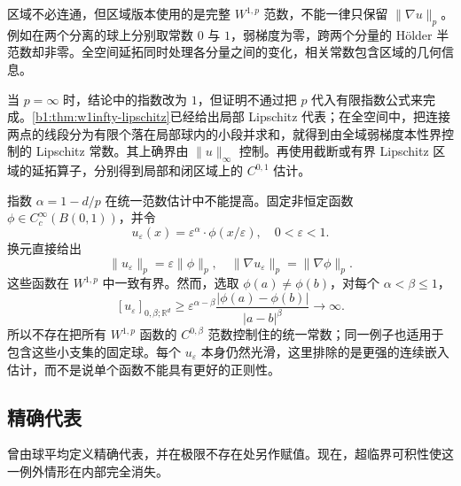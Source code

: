 区域不必连通，但区域版本使用的是完整 \(W^{1,p}\) 范数，不能一律只保留 \(\|\nabla u\|_p\)。例如在两个分离的球上分别取常数 \(0\) 与 \(1\)，弱梯度为零，跨两个分量的 Hölder 半范数却非零。全空间延拓同时处理各分量之间的变化，相关常数包含区域的几何信息。

\ProseParagraphBreak

当 \(p=\infty\) 时，结论中的指数改为 \(1\)，但证明不通过把 \(p\) 代入有限指数公式来完成。\cref{b1:thm:w1infty-lipschitz}已经给出局部 Lipschitz 代表；在全空间中，把连接两点的线段分为有限个落在局部球内的小段并求和，就得到由全域弱梯度本性界控制的 Lipschitz 常数。其上确界由 \(\|u\|_\infty\) 控制。再使用截断或有界 Lipschitz 区域的延拓算子，分别得到局部和闭区域上的 \(C^{0,1}\) 估计。

\ProseParagraphBreak

指数 \(\alpha=1-d/p\) 在统一范数估计中不能提高。固定非恒定函数 \(\phi\in C_c^\infty(B(0,1))\)，并令
\[
 u_\varepsilon(x)=\varepsilon^\alpha\cdot\phi(x/\varepsilon),
 \quad 0<\varepsilon<1.
\]
换元直接给出
\[
 \|u_\varepsilon\|_p=\varepsilon\|\phi\|_p,\quad
 \|\nabla u_\varepsilon\|_p=\|\nabla\phi\|_p.
\]
这些函数在 \(W^{1,p}\) 中一致有界。然而，选取 \(\phi(a)\ne\phi(b)\)，对每个 \(\alpha<\beta\le1\)，
\[
 [u_\varepsilon]_{0,\beta;\mathbb R^d}
 \ge\varepsilon^{\alpha-\beta}
       \frac{|\phi(a)-\phi(b)|}{|a-b|^\beta}
 \longrightarrow\infty.
\]
所以不存在把所有 \(W^{1,p}\) 函数的 \(C^{0,\beta}\) 范数控制住的统一常数；同一例子也适用于包含这些小支集的固定球。每个 \(u_\varepsilon\) 本身仍然光滑，这里排除的是更强的连续嵌入估计，而不是说单个函数不能具有更好的正则性。

\subsection{精确代表}
\label{b1:subsec:240304}

曾由球平均定义精确代表，并在极限不存在处另作赋值。现在，超临界可积性使这一例外情形在内部完全消失。

